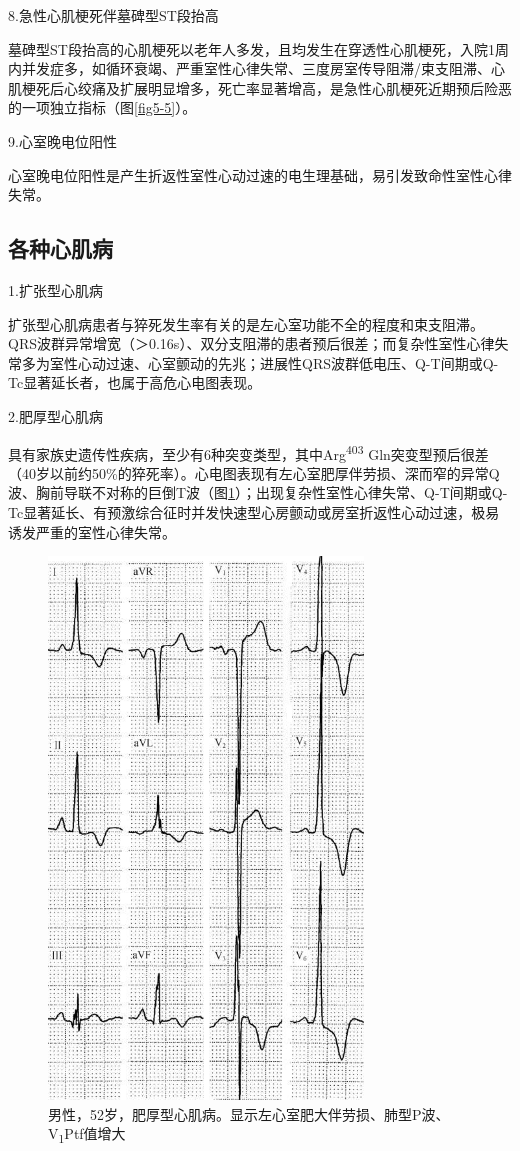 8.急性心肌梗死伴墓碑型ST段抬高

墓碑型ST段抬高的心肌梗死以老年人多发，且均发生在穿透性心肌梗死，入院1周内并发症多，如循环衰竭、严重室性心律失常、三度房室传导阻滞/束支阻滞、心肌梗死后心绞痛及扩展明显增多，死亡率显著增高，是急性心肌梗死近期预后险恶的一项独立指标（图\ref{fig5-5}）。

9.心室晚电位阳性

心室晚电位阳性是产生折返性室性心动过速的电生理基础，易引发致命性室性心律失常。

\protect\hypertarget{text00041.htmlux5cux23subid450}{}{}

\subsection{各种心肌病}

1.扩张型心肌病

扩张型心肌病患者与猝死发生率有关的是左心室功能不全的程度和束支阻滞。QRS波群异常增宽（＞0.16s）、双分支阻滞的患者预后很差；而复杂性室性心律失常多为室性心动过速、心室颤动的先兆；进展性QRS波群低电压、Q-T间期或Q-Tc显著延长者，也属于高危心电图表现。

2.肥厚型心肌病

具有家族史遗传性疾病，至少有6种突变类型，其中Arg\textsuperscript{403}
Gln突变型预后很差（40岁以前约50\%的猝死率）。心电图表现有左心室肥厚伴劳损、深而窄的异常Q波、胸前导联不对称的巨倒T波（图\ref{fig34-8}）；出现复杂性室性心律失常、Q-T间期或Q-Tc显著延长、有预激综合征时并发快速型心房颤动或房室折返性心动过速，极易诱发严重的室性心律失常。

\begin{figure}[!htbp]
 \centering
 \includegraphics[width=3.29167in,height=5.66667in]{./images/Image00548.jpg}
 \captionsetup{justification=centering}
 \caption{男性，52岁，肥厚型心肌病。显示左心室肥大伴劳损、肺型P波、V\textsubscript{1}Ptf值增大}
 \label{fig34-8}
  \end{figure} 


